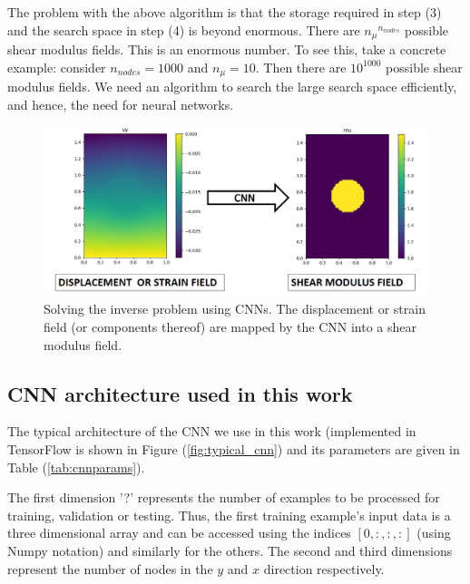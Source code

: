 \documentclass[12pt]{article}
\begin{document}
The problem with the above algorithm is that the storage required in step (3) and the search space in step (4) is beyond enormous. There are ${n_{\mu}}^{n_{nodes}}$ possible shear modulus fields. This is an enormous number. To see this, take a concrete example: consider $n_{nodes}=1000$ and $n_{\mu}=10$. Then there are $10^{1000}$ possible shear modulus fields. We need an algorithm to search the large search space efficiently, and hence, the need for neural networks.
%
\begin{figure}[h]
   \centering
    \includegraphics[totalheight=5cm]{Figures/schematic_inv/schematic_inv.png}
  \caption{\label{fig:schematic_inv} Solving the inverse problem using CNNs. The displacement or strain field (or components thereof) are mapped by the CNN into a shear modulus field.}
\end{figure}
%
\subsection{\label{sect:cnnarch} CNN architecture used in this work}
The typical architecture of the CNN we use in this work (implemented in TensorFlow is shown in Figure (\ref{fig:typical_cnn}) and its parameters are given in Table (\ref{tab:cnnparams}).

The first dimension '?' represents the number of examples to be processed for training, validation or testing. Thus, the first training example's input data is a three dimensional array and can be accessed using the indices $[0,:,:,:]$ (using Numpy \cite{paper:numpy} notation) and similarly for the others. The second and third dimensions represent the number of nodes in the $y$ and $x$ direction respectively.
\end{document}
